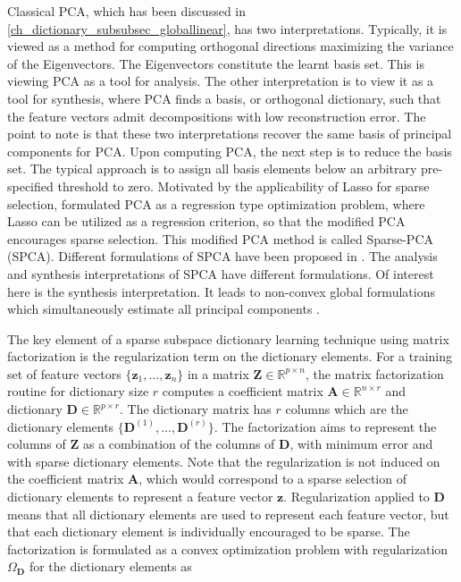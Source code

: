 Classical PCA, which has been discussed in \cref{ch_dictionary_subsubsec_globallinear}, has two interpretations. Typically, it is viewed as a method for computing orthogonal directions maximizing the variance of the Eigenvectors. The Eigenvectors constitute the learnt basis set. This is viewing PCA as a tool for analysis. The other interpretation is to view it as a tool for synthesis, where PCA finds a basis, or orthogonal dictionary, such that the feature vectors admit decompositions with low reconstruction error. The point to note is that these two interpretations recover the same basis of principal components for PCA. Upon computing PCA, the next step is to reduce the basis set. The typical approach is to assign all basis elements below an arbitrary pre-specified threshold to zero. Motivated by the applicability of Lasso \citep{Tibshirani1994} for sparse selection, \citet{Zou2004} formulated PCA as a regression type optimization problem, where Lasso can be utilized as a regression criterion, so that the modified PCA encourages sparse selection. This modified PCA method is called Sparse-PCA (SPCA). Different formulations of SPCA have been proposed in \citep{Jolliffe2002, Zou2003, Aspremont2008}. The analysis and synthesis interpretations of SPCA have different formulations. Of interest here is the synthesis interpretation. It leads to non-convex global formulations which simultaneously estimate all principal components \citep{Mairal2010}. 

The key element of a sparse subspace dictionary learning technique using matrix factorization is the regularization term on the dictionary elements. For a training set of feature vectors $\{ \mathbf{z}_{1}, \ldots, \mathbf{z}_{n} \}$ in a matrix $\mathbf{Z} \in \mathds{R}^{p \times n}$, the matrix factorization routine for dictionary size $r$ computes a coefficient matrix $\mathbf{A} \in \mathds{R}^{n \times r}$ and dictionary $\mathbf{D} \in \mathds{R}^{p \times r}$. The dictionary matrix has $r$ columns which are the dictionary elements $\{\mathbf{D}^{(1)}, \ldots, \mathbf{D}^{(r)} \}$. The factorization aims to represent the columns of $\mathbf{Z}$ as a combination of the columns of $\mathbf{D}$, with minimum error and with sparse dictionary elements. Note that the regularization is not induced on the coefficient matrix $\mathbf{A}$, which would correspond to a sparse selection of dictionary elements to represent a feature vector $\mathbf{z}$. Regularization applied to $\mathbf{D}$ means that all 
dictionary elements are used to represent each feature vector, but that each dictionary element is individually encouraged to be sparse. The factorization is formulated as a convex optimization problem with regularization $\Omega_{\mathbf{D}}$ for the dictionary elements as

